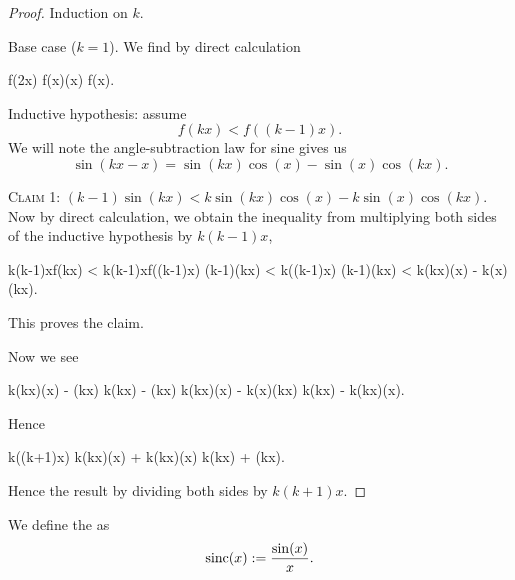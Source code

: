 \begin{proof}
Induction on $k$.

Base case ($k=1$). We find by direct calculation
\begin{calculation}
f(2x)
f(x)\cos(x)
f(x).
\end{calculation}

Inductive hypothesis: assume
\begin{equation}
f(kx) < f((k-1)x).
\end{equation}
We will note the angle-subtraction law for sine gives us
\begin{equation}
\sin(kx - x) = \sin(kx)\cos(x) - \sin(x)\cos(kx).
\end{equation}

\textsc{Claim 1:} $(k-1)\sin(kx) < k\sin(kx)\cos(x) - k\sin(x)\cos(kx).$
Now by direct calculation, we obtain the inequality from multiplying
both sides of the inductive hypothesis by $k(k-1)x$,
\begin{calculation}
k(k-1)xf(kx) < k(k-1)xf((k-1)x)
(k-1)\sin(kx) < k\sin((k-1)x)
(k-1)\sin(kx) < k\sin(kx)\cos(x) - k\sin(x)\cos(kx).
\end{calculation}
This proves the claim.

Now we see
\begin{calculation}
k\sin(kx)\cos(x) - \sin(kx)
k\sin(kx) - \sin(kx)
k\sin(kx)\cos(x) - k\sin(x)\cos(kx)
k\sin(kx) - k\cos(kx)\sin(x).
\end{calculation}
Hence
\begin{calculation}
k\sin((k+1)x)
k\sin(kx)\cos(x) + k\cos(kx)\sin(x)
k\sin(kx) + \sin(kx).
\end{calculation}
Hence the result by dividing both sides by $k(k+1)x$.
\end{proof}

\begin{definition}
We define the  as
\begin{equation}
\operatorname{sinc}(x) := \frac{\sin(x)}{x}.
\end{equation}
\end{definition}

